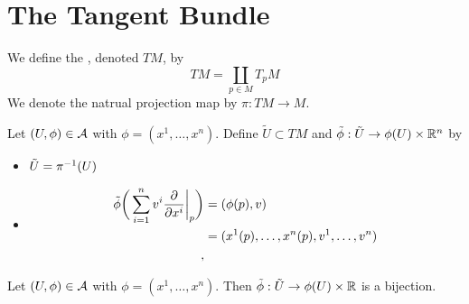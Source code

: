 \documentclass{book}
\begin{document}
	
	
	
	
	
	
	
	
	
	
	
	
	
	
	
	
	
	
	
	
	
	
	
	
	
	
	
	
	
	\newpage
	\section{The Tangent Bundle}
	\begin{defn}
		We define the , denoted $TM$, by $$TM = \coprod_{p \in M} T_pM$$ 
		We denote the natrual projection map by $\pi: TM \rightarrow M$.
	\end{defn}
	
	\begin{defn}
		Let $(U, \phi) \in \mathcal{A}$ with $\phi = (x^1, \dots, x^n)$. Define $\tilde{U} \subset TM$ and $\tilde{\phi}: \tilde{U} \rightarrow \phi(U) \times \mathbb{R}^{n}$ by  
		\begin{itemize}
			\item $\tilde{U} = \pi^{-1}(U)$
			\item 
			\begin{align*}
				\tilde{\phi} \bigg(\sum\limits_{i =1}^n v^i \frac{\partial}{\partial x^i} \bigg|_p \bigg) 
				&= (\phi(p), v) \\
				&= (x^1(p), \dots, x^n(p), v^1, \dots, v^n) \\
, 			\end{align*}
		\end{itemize}
	\end{defn}

	\begin{ex}
		Let $(U, \phi) \in \mathcal{A}$ with $\phi = (x^1, \dots, x^n)$. Then $\tilde{\phi}:\tilde{U} \rightarrow \phi(U) \times \mathbb{R}$ is a bijection. 
	\end{ex}
\end{document}
